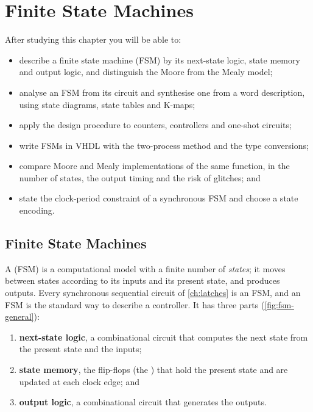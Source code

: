 \chapter{Finite State Machines}\label{ch:fsm}

\begin{objectives}
After studying this chapter you will be able to:
\begin{itemize}
  \item describe a finite state machine (FSM) by its next-state logic, state memory and output logic, and distinguish the Moore from the Mealy model;
  \item analyse an FSM from its circuit and synthesise one from a word description, using state diagrams, state tables and K-maps;
  \item apply the design procedure to counters, controllers and one-shot circuits;
  \item write FSMs in VHDL with the two-process method and the  type conversions;
  \item compare Moore and Mealy implementations of the same function, in the number of states, the output timing and the risk of glitches; and
  \item state the clock-period constraint of a synchronous FSM and choose a state encoding.
\end{itemize}
\end{objectives}

\section{Finite State Machines}\label{sec:fsm-recall}
A  (FSM) is a computational model with a finite number of \emph{states}; it moves between states according to its inputs and its present state, and produces outputs. Every synchronous sequential circuit of \cref{ch:latches} is an FSM, and an FSM is the standard way to describe a controller. It has three parts (\cref{fig:fsm-general}):
\begin{enumerate}
  \item \textbf{next-state logic}, a combinational circuit that computes the next state from the present state and the inputs;
  \item \textbf{state memory}, the flip-flops (the ) that hold the present state and are updated at each clock edge; and
  \item \textbf{output logic}, a combinational circuit that generates the outputs.
\end{enumerate}

